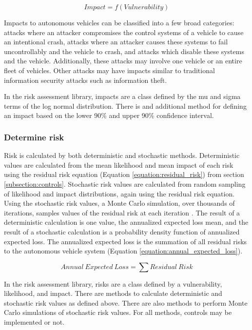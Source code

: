 \documentclass{article}
\begin{document}
\begin{equation}
    Impact = f(Vulnerability)
    \label{equation:impact}
\end{equation}

Impacts to autonomous vehicles can be classified into a few broad categories: attacks where an attacker compromises the control systems of a vehicle to cause an intentional crash, attacks where an attacker causes these systems to fail uncontrollably and the vehicle to crash, and attacks which disable these systems and the vehicle. Additionally, these attacks may involve one vehicle or an entire fleet of vehicles.  Other attacks may have impacts similar to traditional information security attacks such as information theft.

In the risk assessment library, impacts are a class defined by the mu and sigma terms of the log normal distribution. There is and additional method for defining an impact based on the lower 90\% and upper 90\% confidence interval.

\subsubsection{Determine risk} \label{subsubsection:determine_risk}

Risk is calculated by both deterministic and stochastic methods. Deterministic values are calculated from the mean likelihood and mean impact of each risk using the residual risk equation (Equation \ref{equation:residual_risk}) from section \ref{subsection:controls}. Stochastic risk values are calculated from random sampling of likelihood and impact distributions, again using the residual risk equation. Using the stochastic risk values, a Monte Carlo simulation, over thousands of iterations, samples values of the residual risk at each iteration \citep[page 477]{carey_risks_2006}. The result of a deterministic calculation is one value, the annualized expected loss mean, and the result of a stochastic calculation is a probability density function of annualized expected loss. The annualized expected loss is the summation of all residual risks to the autonomous vehicle system (Equation \ref{equation:annual_expected_loss}).

\begin{equation}
    Annual\ Expected\ Loss = \sum Residual\ Risk
    \label{equation:annual_expected_loss}
\end{equation}

In the risk assessment library, risks are a class defined by a vulnerability, likelihood, and impact. There are methods to calculate deterministic and stochastic risk values as defined above. There are also methods to perform Monte Carlo simulations of stochastic risk values. For all methods, controls may be implemented or not.
\end{document}
